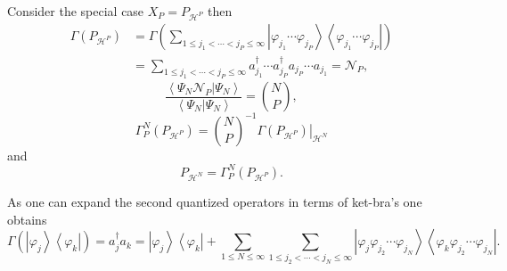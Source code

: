 \documentclass[aps,preprint]{revtex4}%
\begin{document}
Consider the special case $X_{P}=P_{\mathcal{H}^{P}}$ then
\begin{align}
\Gamma\left(  P_{\mathcal{H}^{P}}\right)   &  =\Gamma\left(  \sum_{1\leq
j_{1}<\cdots<j_{P}\leq\infty}\left\vert \varphi_{j_{1}}\cdots\varphi_{j_{P}%
}\right\rangle \left\langle \varphi_{j_{1}}\cdots\varphi_{j_{P}}\right\vert
\right) \nonumber\\
&  =\sum_{1\leq j_{1}<\cdots<j_{P}\leq\infty}a_{j_{1}}^{\dagger}\cdots
a_{j_{P}}^{\dagger}a_{j_{P}}\cdots a_{j_{1}}=\mathcal{N}_{P},
\end{align}%
\begin{equation}
\frac{\left\langle \Psi_{N}\left.  \mathcal{N}_{P}\right\vert \Psi
_{N}\right\rangle }{\left\langle \left.  \Psi_{N}\right\vert \Psi
_{N}\right\rangle }=\binom{N}{P},
\end{equation}%
\begin{equation}
\Gamma_{P}^{N}\left(  P_{\mathcal{H}^{P}}\right)  =\binom{N}{P}^{-1}\left.
\Gamma\left(  P_{\mathcal{H}^{P}}\right)  \right\vert _{\mathcal{H}^{N}}%
\end{equation}
and
\begin{equation}
P_{\mathcal{H}^{N}}=\Gamma_{P}^{N}\left(  P_{\mathcal{H}^{P}}\right)  .
\end{equation}


As one can expand the second quantized operators in terms of ket-bra's one
obtains
\begin{equation}
\Gamma\left(  \left\vert \varphi_{j}\right\rangle \left\langle \varphi
_{k}\right\vert \right)  =a_{j}^{\dagger}a_{k}=\left\vert \varphi
_{j}\right\rangle \left\langle \varphi_{k}\right\vert +\sum_{1\leq N\leq
\infty}\sum_{1\leq j_{2}<\cdots<j_{N}\leq\infty}\left\vert \varphi_{j}%
\varphi_{j_{2}}\cdots\varphi_{j_{N}}\right\rangle \left\langle \varphi
_{k}\varphi_{j_{2}}\cdots\varphi_{j_{N}}\right\vert .
\end{equation}
\end{document}

